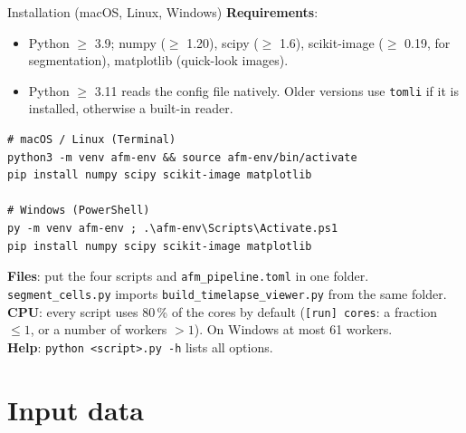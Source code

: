 \documentclass[aspectratio=169,9pt]{beamer}
\begin{document}
\begin{frame}[fragile]{Installation (macOS, Linux, Windows)}
\small
\textbf{Requirements}:
\begin{itemize}
\item Python $\ge$ 3.9; numpy ($\ge$ 1.20), scipy ($\ge$ 1.6), scikit-image ($\ge$ 0.19, for segmentation), matplotlib (quick-look images).
\item Python $\ge$ 3.11 reads the config file natively. Older versions use \texttt{tomli} if it is installed, otherwise a built-in reader.
\end{itemize}
\begin{lstlisting}
# macOS / Linux (Terminal)
python3 -m venv afm-env && source afm-env/bin/activate
pip install numpy scipy scikit-image matplotlib

# Windows (PowerShell)
py -m venv afm-env ; .\afm-env\Scripts\Activate.ps1
pip install numpy scipy scikit-image matplotlib
\end{lstlisting}
\textbf{Files}: put the four scripts and \texttt{afm\_pipeline.toml} in one folder. \texttt{segment\_cells.py} imports \texttt{build\_timelapse\_viewer.py} from the same folder.\\[3pt]
\textbf{CPU}: every script uses 80\,\% of the cores by default (\texttt{[run] cores}: a fraction $\le1$, or a number of workers $>1$). On Windows at most 61 workers.\\[3pt]
\textbf{Help}: \texttt{python <script>.py -h} lists all options.
\end{frame}

\section{Input data}
\end{document}

